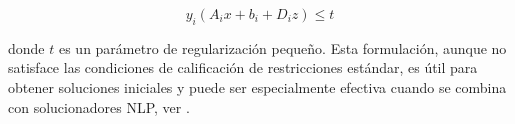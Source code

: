 \[ y_i(A_ix + b_i + D_iz) \leq t \]

donde $t$ es un parámetro de regularización pequeño. Esta formulación, aunque no satisface las condiciones de calificación de restricciones estándar, es útil para obtener soluciones iniciales y puede ser especialmente efectiva cuando se combina con solucionadores NLP, ver \cite{BilevelJump}.


%
%
%
%
%
%
%
%
